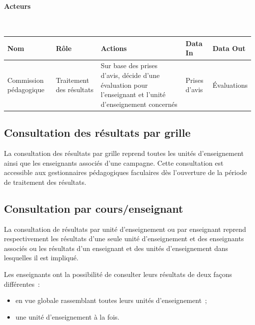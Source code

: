 \documentclass[a4paper,11pt]{report}
\begin{document}
\paragraph{Acteurs}~\newline{}

\begin{tabularx}{\linewidth}{|X|X|X|X|X|} \hline
Nom & Rôle & Actions & Data In & Data Out \\ \hline 
Commission pédagogique & Traitement des résultats & Sur base des prises d'avis, décide d'une évaluation pour l'enseignant et l'unité d'enseignement concernés & Prises d'avis & Évaluations \\ \hline
\end{tabularx}






\subsection{Consultation des résultats par grille}

La consultation des résultats par grille reprend toutes les unités d'enseignement ainsi que les enseignants associés d'une campagne.
Cette consultation est accessible aux gestionnaires pédagogiques faculaires dès l'ouverture de la période de traitement des résultats.





\subsection{Consultation par cours/enseignant}

La consultation de résultats par unité d'enseignement ou par enseignant reprend respectivement les résultats d'une seule unité d'enseignement et des enseignants associés ou les résultats d'un enseignant et des unités d'enseignement dans lesquelles il est impliqué.


Les enseignants ont la possibilité de consulter leurs résultats de deux façons différentes~:
\begin{itemize}
	\item en vue globale rassemblant toutes leurs unités d'enseignement~;
	\item une unité d'enseignement à la fois.
\end{itemize}
\end{document}
